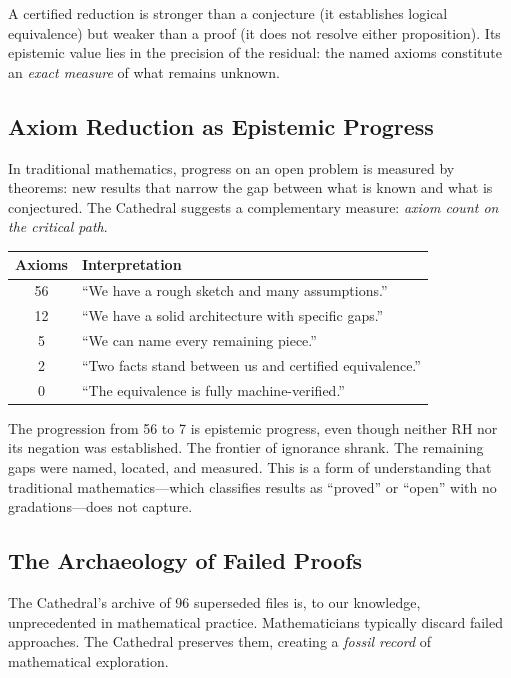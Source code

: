 \documentclass[11pt,a4paper]{article}
\newcommand{\RH}{\ensuremath{\mathrm{RH}}}
\begin{document}
A certified reduction is stronger than a conjecture (it establishes
logical equivalence) but weaker than a proof (it does not resolve
either proposition). Its epistemic value lies in the precision of
the residual: the named axioms constitute an \emph{exact measure}
of what remains unknown.

\subsection{Axiom Reduction as Epistemic Progress}

In traditional mathematics, progress on an open problem is measured
by theorems: new results that narrow the gap between what is known
and what is conjectured. The Cathedral suggests a complementary
measure: \emph{axiom count on the critical path}.

\begin{center}
\begin{tabular}{@{}cl@{}}
\toprule
\textbf{Axioms} & \textbf{Interpretation} \\
\midrule
56 & ``We have a rough sketch and many assumptions.'' \\
12 & ``We have a solid architecture with specific gaps.'' \\
5 & ``We can name every remaining piece.'' \\
2 & ``Two facts stand between us and certified equivalence.'' \\
0 & ``The equivalence is fully machine-verified.'' \\
\bottomrule
\end{tabular}
\end{center}

The progression from 56 to 7 is epistemic progress, even though
neither \RH{} nor its negation was established. The frontier of
ignorance shrank. The remaining gaps were named, located, and
measured. This is a form of understanding that traditional
mathematics---which classifies results as ``proved'' or ``open''
with no gradations---does not capture.

\subsection{The Archaeology of Failed Proofs}

The Cathedral's archive of 96 superseded files is, to our knowledge,
unprecedented in mathematical practice. Mathematicians typically
discard failed approaches. The Cathedral preserves them, creating a
\emph{fossil record} of mathematical exploration.
\end{document}
